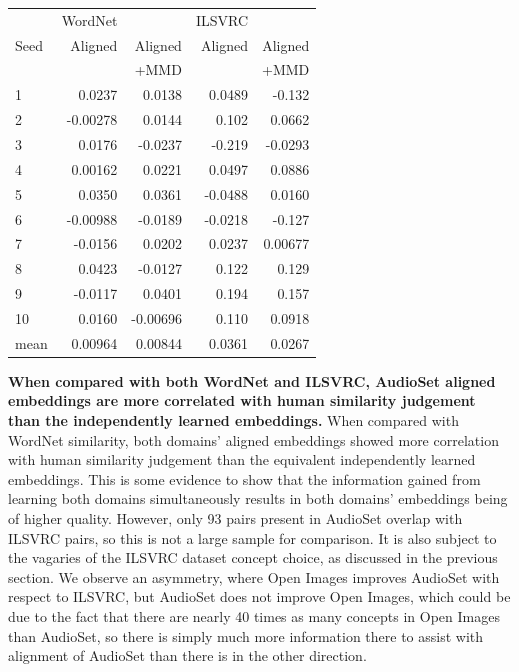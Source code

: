 \begin{table}[H]
\begin{tabular}{lrrrr}
  \toprule
       &     WordNet  &           &  ILSVRC  &            \\
{Seed} &      Aligned &  Aligned  &  Aligned &  Aligned   \\
{}     &               & +MMD     &          &   +MMD     \\
\midrule
1    &    0.0237 &     0.0138  &   0.0489 &    -0.132    \\
2    &   -0.00278 &     0.0144 &   0.102  &     0.0662   \\
3    &    0.0176 &    -0.0237  &  -0.219  &    -0.0293   \\
4    &    0.00162 &     0.0221 &   0.0497 &     0.0886   \\
5    &    0.0350 &     0.0361  &  -0.0488 &     0.0160   \\
6    &   -0.00988 &    -0.0189 &  -0.0218 &    -0.127    \\
7    &   -0.0156 &     0.0202  &   0.0237 &     0.00677  \\
8    &    0.0423 &    -0.0127  &   0.122  &     0.129    \\
9    &   -0.0117 &     0.0401  &   0.194  &     0.157    \\
10   &    0.0160 &    -0.00696 &   0.110  &     0.0918   \\
\midrule                                                                    
mean &    0.00964 &     0.00844 &   0.0361 &     0.0267  \\
\bottomrule
\end{tabular}
\end{table}

\textbf{When compared with both WordNet and ILSVRC, AudioSet aligned embeddings are more correlated with human similarity judgement than the independently learned embeddings.}  When compared with WordNet similarity, both domains' aligned embeddings showed more correlation with human similarity judgement than the equivalent independently learned embeddings. This is some evidence to show that the information gained from learning both domains simultaneously results in both domains' embeddings being of higher quality. However, only 93 pairs present in AudioSet overlap with ILSVRC pairs, so this is not a large sample for comparison. It is also subject to the vagaries of the ILSVRC dataset concept choice, as discussed in the previous section. We observe an asymmetry, where Open Images improves AudioSet with respect to ILSVRC, but AudioSet does not improve Open Images, which could be due to the fact that there are nearly 40 times as many concepts in Open Images than AudioSet, so there is simply much more information there to assist with alignment of AudioSet than there is in the other direction. 


